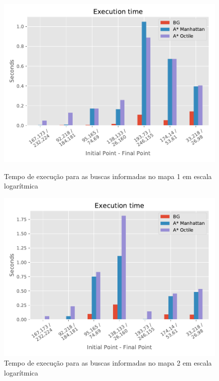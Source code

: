 \begin{figure}[!htb]
\begin{minipage}{0.5\linewidth}
\centering
\includegraphics[width=\textwidth]{Images/Execution_time_map1_log_heuristic.pdf}
\caption{Tempo de execução para as buscas informadas no mapa 1 em escala logarítmica}
\label{fig:time1-heur}
\end{minipage}%
\begin{minipage}{0.5\linewidth}
\centering
\includegraphics[width=\textwidth]{Images/Execution_time_map2_log_heuristic.pdf}
\caption{Tempo de execução para as buscas informadas no mapa 2 em escala logarítmica}
\label{fig:time2-heur}
\end{minipage}
\begin{minipage}{0.5\linewidth}

\end{minipage}
\end{figure}
